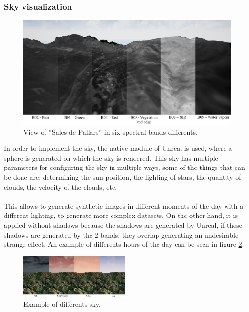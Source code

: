 \documentclass[10pt,a4paper,twocolumn,twoside]{article}
\begin{document}
\subsubsection{Sky visualization}

\begin{figure}[!h]
\centering
  	\includegraphics[width=1\textwidth]{multispectral/bands}
	\caption{View of ''Sales de Pallars'' in six spectral bands differents.}
	\label{fig-bands}
\end{figure}

In order to implement the sky, the native module of Unreal is used, where a sphere is generated on which the sky is rendered. This sky has multiple parameters for configuring the sky in multiple ways, some of the things that can be done are: determining the sun position, the lighting of stars, the quantity of clouds, the velocity of the clouds, etc.
\\\\
This allows to generate synthetic images in different moments of the day with a different lighting, to generate more complex datasets. On the other hand, it is applied without shadows because the shadows are generated by Unreal, if these shadows are generated by the 2 bands, they overlap generating an undesirable strange effect. An example of differents hours of the day can be seen in figure \ref{fig-sky}.

\begin{figure}[!h]
\centering
  	\includegraphics[width=0.49\textwidth]{sky/sky}
	\caption{Example of differents sky.}
	\label{fig-sky}
\end{figure}
\end{document}
